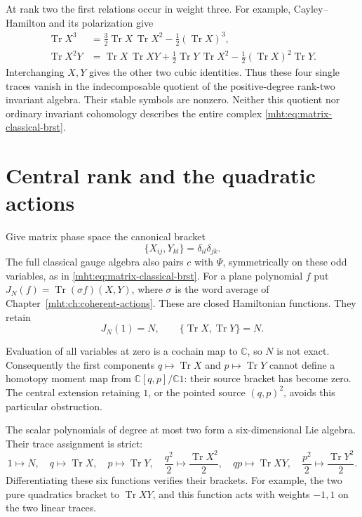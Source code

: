 At rank two the first relations occur in weight three. For
example, Cayley--Hamilton and its polarization give
\begin{align*}
 \operatorname{Tr}X^3
 &=\tfrac32\operatorname{Tr}X\,\operatorname{Tr}X^2
   -\tfrac12(\operatorname{Tr}X)^3,\\
 \operatorname{Tr}X^2Y
 &=\operatorname{Tr}X\,\operatorname{Tr}XY
   +\tfrac12\operatorname{Tr}Y\,\operatorname{Tr}X^2
   -\tfrac12(\operatorname{Tr}X)^2\operatorname{Tr}Y.
\end{align*}
Interchanging $X,Y$ gives the other two cubic identities.
Thus these four single traces vanish in the indecomposable
quotient of the positive-degree rank-two invariant algebra.
Their stable symbols are nonzero. Neither this quotient nor
ordinary invariant cohomology describes the entire complex
\eqref{mht:eq:matrix-classical-brst}.

\section{Central rank and the quadratic actions}

Give matrix phase space the canonical bracket
\[
 \{X_{ij},Y_{kl}\}=\delta_{il}\delta_{jk}.
\]
The full classical gauge algebra also pairs $c$ with $\Psi$,
symmetrically on these odd variables, as in
\eqref{mht:eq:matrix-classical-brst}. For a plane polynomial $f$
put $J_N(f)=\operatorname{Tr}(\sigma f)(X,Y)$, where $\sigma$
is the word average of Chapter~\ref{mht:ch:coherent-actions}.
These are closed Hamiltonian functions. They retain
\[
 J_N(1)=N,\qquad
 \{\operatorname{Tr}X,\operatorname{Tr}Y\}=N.
\]

Evaluation of all variables at zero is a cochain map to
$\mathbb C$, so $N$ is not exact. Consequently the first
components $q\mapsto\operatorname{Tr}X$ and
$p\mapsto\operatorname{Tr}Y$ cannot define a homotopy moment map
from $\mathbb C[q,p]/\mathbb C1$: their source bracket has
become zero. The central extension retaining $1$, or the pointed
source $(q,p)^2$, avoids this particular obstruction.

The scalar polynomials of degree at most two form a six-dimensional
Lie algebra. Their trace assignment is strict:
\[
 1\mapsto N,\quad q\mapsto\operatorname{Tr}X,\quad
 p\mapsto\operatorname{Tr}Y,\quad
 \frac{q^2}{2}\mapsto\frac{\operatorname{Tr}X^2}{2},\quad
 qp\mapsto\operatorname{Tr}XY,\quad
 \frac{p^2}{2}\mapsto\frac{\operatorname{Tr}Y^2}{2}.
\]
Differentiating these six functions verifies their brackets.
For example, the two pure quadratics bracket to
$\operatorname{Tr}XY$, and this function acts with weights
$-1,1$ on the two linear traces.

